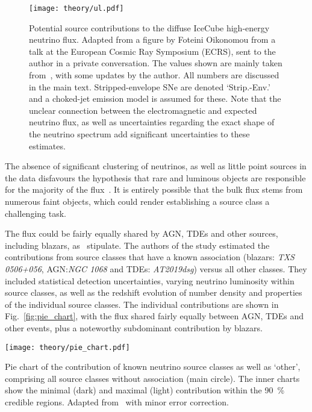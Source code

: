 \begin{figure}[htb]
    \texttt{[image: theory/ul.pdf]}
    \caption[Contribution to HE neutrino flux]{Potential source contributions to the diffuse IceCube high-energy neutrino flux. Adapted from a figure by Foteini Oikonomou from a talk at the  European Cosmic Ray Symposium (ECRS), sent to the author in a private conversation. The values shown are mainly taken from~\cite{Guepin2022}, with some updates by the author. All numbers are discussed in the main text. Stripped-envelope SNe are denoted `Strip.-Env.' and a choked-jet emission model is assumed for these. Note that the unclear connection between the electromagnetic and expected neutrino flux, as well as uncertainties regarding the exact shape of the neutrino spectrum add significant uncertainties to these estimates.}
\end{figure}

The absence of significant clustering of neutrinos, as well as little point sources in the data disfavours the hypothesis that rare and luminous objects are responsible for the majority of the flux~. It is entirely possible that the bulk flux stems from numerous faint objects, which could render establishing a source class a challenging task.

The flux could be fairly equally shared by AGN, TDEs and other sources, including blazars, as~ stipulate. The authors of the study estimated the contributions from source classes that have a known association (blazars: \emph{TXS 0506+056}, AGN:\@ \emph{NGC 1068} and TDEs: \emph{AT2019dsg}) versus all other classes. They included statistical detection uncertainties, varying neutrino luminosity within source classes, as well as the redshift evolution of number density and properties of the individual source classes. The individual contributions are shown in Fig.~\ref{fig:pie_chart}, with the flux shared fairly equally between AGN, TDEs and other events, plus a noteworthy subdominant contribution by blazars.

\begin{marginfigure}
    \texttt{[image: theory/pie\_chart.pdf]}
    \caption[Neutrino flux contribution pie chart]{Pie chart of the contribution of known neutrino source classes as well as `other', comprising all source classes without association (main circle). The inner charts show the minimal (dark) and maximal (light) contribution within the \SI{90}{\percent} credible regions. Adapted from~\cite{Bartos2021} with minor error correction.}
\end{marginfigure}

